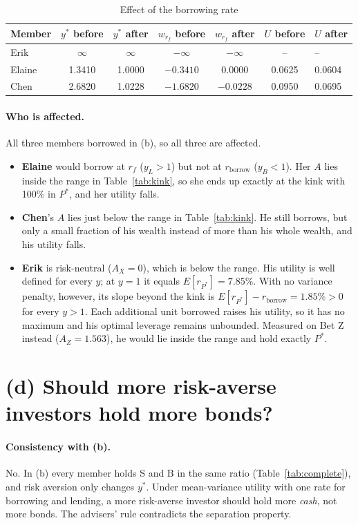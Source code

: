 \documentclass[11pt]{article}
\newcommand{\rb}{r_{\text{borrow}}}
\newcommand{\Er}[1]{E[r_{#1}]}
\begin{document}
\begin{table}[H]
\centering
\caption{Effect of the borrowing rate}
\begin{tabular}{lcccccl}
\toprule
Member & $y^*$ before & $y^*$ after & $w_{r_f}$ before & $w_{r_f}$ after & $U$ before & $U$ after \\
\midrule
Erik   & $\infty$ & $\infty$ & $-\infty$ & $-\infty$ & -- & -- \\
Elaine & 1.3410 & 1.0000 & $-0.3410$ & 0.0000    & 0.0625 & 0.0604 \\
Chen   & 2.6820 & 1.0228 & $-1.6820$ & $-0.0228$ & 0.0950 & 0.0695 \\
\bottomrule
\end{tabular}
\end{table}

\paragraph{Who is affected.}
All three members borrowed in (b), so all three are affected.
\begin{itemize}
  \item \textbf{Elaine} would borrow at $r_f$ ($y_L > 1$) but not at $\rb$ ($y_B < 1$). Her $A$ lies inside the range in Table~\ref{tab:kink}, so she ends up exactly at the kink with 100\% in $P^*$, and her utility falls.
  \item \textbf{Chen}'s $A$ lies just below the range in Table~\ref{tab:kink}. He still borrows, but only a small fraction of his wealth instead of more than his whole wealth, and his utility falls.
  \item \textbf{Erik} is risk-neutral ($A_X = 0$), which is below the range. His utility is well defined for every $y$; at $y = 1$ it equals $\Er{P^*} = 7.85\%$. With no variance penalty, however, its slope beyond the kink is $\Er{P^*} - \rb = 1.85\% > 0$ for every $y > 1$. Each additional unit borrowed raises his utility, so it has no maximum and his optimal leverage remains unbounded. Measured on Bet Z instead ($A_Z = 1.563$), he would lie inside the range and hold exactly $P^*$.
\end{itemize}

\section*{(d) Should more risk-averse investors hold more bonds?}

\paragraph{Consistency with (b).}
No. In (b) every member holds S and B in the same ratio (Table~\ref{tab:complete}), and risk aversion only changes $y^*$. Under mean-variance utility with one rate for borrowing and lending, a more risk-averse investor should hold more \emph{cash}, not more bonds. The advisers' rule contradicts the separation property.
\end{document}
